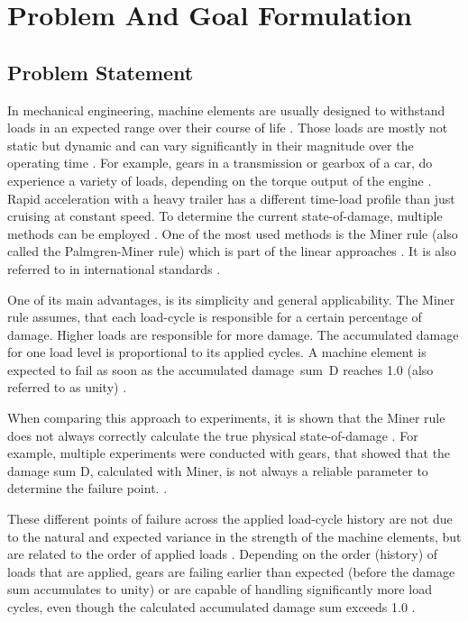 \section{Problem And Goal Formulation}
\subsection{Problem Statement}\label{prob}

In mechanical engineering, machine elements are usually designed to withstand loads in an expected range over their course of life \cite{Vietze}. Those loads are mostly not static but dynamic and can vary significantly in their magnitude over the operating time \cite{Wittel}. For example, gears in a transmission or gearbox of a car, do experience a variety of loads, depending on the torque output of the engine \cite{Yuksel}. Rapid acceleration with a heavy trailer has a different time-load profile than just cruising at constant speed.
\newpage
To determine the current state-of-damage, multiple methods can be employed \cite{Lee}. One of the most used methods is the Miner rule \cite{MinerOG} (also called the Palmgren-Miner rule) which is part of the linear approaches \cite{Sun}. It is also referred to in international standards \cite{ISO1}.

One of its main advantages, is its simplicity and general applicability. The Miner rule assumes, that each load-cycle is responsible for a certain percentage of damage. Higher loads are responsible for more damage. The accumulated damage for one load level is proportional to its applied cycles. A machine element is expected to fail as soon as the accumulated damage~sum~D reaches 1.0 (also referred to as unity) \cite{ISO1, Miller}.

When comparing this approach to experiments, it is shown that the Miner rule does not always correctly calculate the true physical state-of-damage \cite{Pavlou}. For example, multiple experiments were conducted with gears, that showed that the damage sum D, calculated with Miner, is not always a reliable parameter to determine the failure point. \cite{Hanumanna}.

These different points of failure across the applied load-cycle history are not due to the natural and expected variance in the strength of the machine elements, but are related to the order of applied loads \cite{Skorupa}. Depending on the order (history) of loads that are applied, gears are failing earlier than expected (before the damage sum accumulates to unity) or are capable of handling significantly more load cycles, even though the calculated accumulated damage sum exceeds 1.0 \cite{Hanumanna}.

